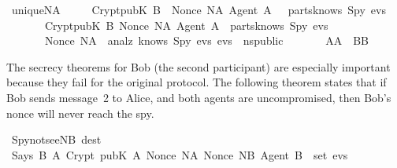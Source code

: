 \begin{isabellebody}
\isamarkuptrue%
\isamarkupfalse%
\ unique{\isacharunderscore}NA{\isacharcolon}\isanewline
\ \ \ \ \ {\isachardoublequoteopen}{\isasymlbrakk}Crypt{\isacharparenleft}pubK\ B{\isacharparenright}\ \ {\isasymlbrace}Nonce\ NA{\isacharcomma}\ Agent\ A\ {\isasymrbrace}\ {\isasymin}\ parts{\isacharparenleft}knows\ Spy\ evs{\isacharparenright}{\isacharsemicolon}\isanewline
\ \ \ \ \ \ \ Crypt{\isacharparenleft}pubK\ B{\isacharprime}{\isacharparenright}\ {\isasymlbrace}Nonce\ NA{\isacharcomma}\ Agent\ A{\isacharprime}{\isasymrbrace}\ {\isasymin}\ parts{\isacharparenleft}knows\ Spy\ evs{\isacharparenright}{\isacharsemicolon}\isanewline
\ \ \ \ \ \ \ Nonce\ NA\ {\isasymnotin}\ analz\ {\isacharparenleft}knows\ Spy\ evs{\isacharparenright}{\isacharsemicolon}\ evs\ {\isasymin}\ ns{\isacharunderscore}public{\isasymrbrakk}\isanewline
\ \ \ \ \ \ {\isasymLongrightarrow}\ A{\isacharequal}A{\isacharprime}\ {\isasymand}\ B{\isacharequal}B{\isacharprime}{\isachardoublequoteclose}%
\isadelimproof
%
\endisadelimproof
%
\isatagproof
%
\endisatagproof
{\isafoldproof}%
%
\isadelimproof
%
\endisadelimproof
%
\isamarkuptrue%
%
\isadelimproof
%
\endisadelimproof
%
\isatagproof
%
\endisatagproof
{\isafoldproof}%
%
\isadelimproof
%
\endisadelimproof
%
\isadelimproof
%
\endisadelimproof
%
\isatagproof
%
\endisatagproof
{\isafoldproof}%
%
\isadelimproof
%
\endisadelimproof
%
\isadelimproof
%
\endisadelimproof
%
\isatagproof
%
\endisatagproof
{\isafoldproof}%
%
\isadelimproof
%
\endisadelimproof
%
\isadelimproof
%
\endisadelimproof
%
\isatagproof
%
\endisatagproof
{\isafoldproof}%
%
\isadelimproof
%
\endisadelimproof
%
\isadelimproof
%
\endisadelimproof
%
\isatagproof
%
\endisatagproof
{\isafoldproof}%
%
\isadelimproof
%
\endisadelimproof
%
\begin{isamarkuptext}%
The secrecy theorems for Bob (the second participant) are especially
important because they fail for the original protocol.  The following
theorem states that if Bob sends message~2 to Alice, and both agents are
uncompromised, then Bob's nonce will never reach the spy.%
\end{isamarkuptext}%
\isamarkuptrue%
\isamarkupfalse%
\ Spy{\isacharunderscore}not{\isacharunderscore}see{\isacharunderscore}NB\ {\isacharbrackleft}dest{\isacharbrackright}{\isacharcolon}\isanewline
\ {\isachardoublequoteopen}{\isasymlbrakk}Says\ B\ A\ {\isacharparenleft}Crypt\ {\isacharparenleft}pubK\ A{\isacharparenright}\ {\isasymlbrace}Nonce\ NA{\isacharcomma}\ Nonce\ NB{\isacharcomma}\ Agent\ B{\isasymrbrace}{\isacharparenright}\ {\isasymin}\ set\ evs{\isacharsemicolon}\isanewline

\end{isabellebody}
